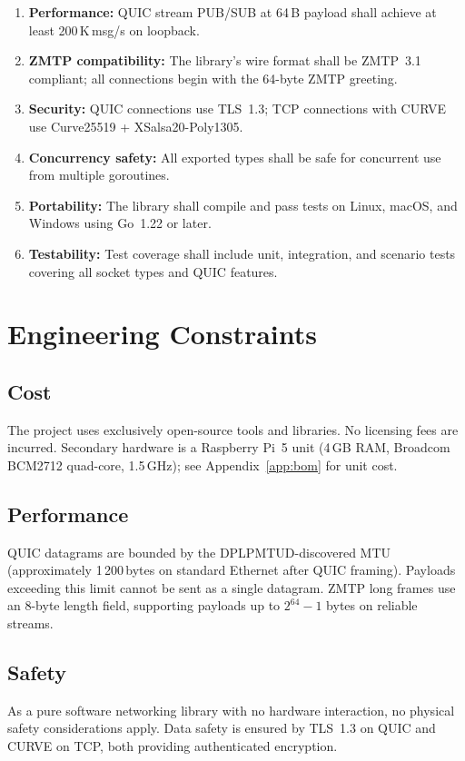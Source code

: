 \documentclass[12pt, a4paper, oneside]{report}
\begin{document}
\begin{enumerate}[label=NFR-\arabic*]
  \item \textbf{Performance:} QUIC stream PUB/SUB at 64\,B payload shall achieve at least 200\,K\,msg/s on loopback.
  \item \textbf{ZMTP compatibility:} The library's wire format shall be ZMTP~3.1 compliant; all connections begin with the 64-byte ZMTP greeting.
  \item \textbf{Security:} QUIC connections use TLS~1.3; TCP connections with CURVE use Curve25519 + XSalsa20-Poly1305.
  \item \textbf{Concurrency safety:} All exported types shall be safe for concurrent use from multiple goroutines.
  \item \textbf{Portability:} The library shall compile and pass tests on Linux, macOS, and Windows using Go~1.22 or later.
  \item \textbf{Testability:} Test coverage shall include unit, integration, and scenario tests covering all socket types and QUIC features.
\end{enumerate}

\section{Engineering Constraints}
\label{sec:constraints}

\subsection{Cost}
The project uses exclusively open-source tools and libraries. No licensing fees are incurred. Secondary hardware is a Raspberry Pi~5 unit (4\,GB RAM, Broadcom BCM2712 quad-core, 1.5\,GHz); see Appendix~\ref{app:bom} for unit cost.

\subsection{Performance}
QUIC datagrams are bounded by the DPLPMTUD-discovered MTU (approximately 1\,200\,bytes on standard Ethernet after QUIC framing). Payloads exceeding this limit cannot be sent as a single datagram. ZMTP long frames use an 8-byte length field, supporting payloads up to $2^{64}-1$ bytes on reliable streams.

\subsection{Safety}
As a pure software networking library with no hardware interaction, no physical safety considerations apply. Data safety is ensured by TLS~1.3 on QUIC and CURVE on TCP, both providing authenticated encryption.
\end{document}
